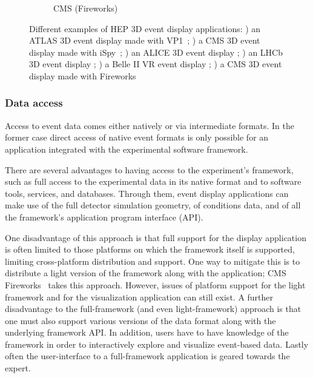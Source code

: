 \documentclass[12pt,a4paper]{article}
\begin{document}
\begin{figure}
\begin{subfigure}[b]{0.475\textwidth}
		\caption[CMS event display]%
		{{\small CMS (Fireworks)}}
		\label{fig:ed-cms-fireworks}
	\end{subfigure}
	\caption[Examples of HEP event displays]
	{\small Different examples of HEP 3D event display applications: ) an ATLAS 3D event display made with VP1~\cite{ATLASED072015,ATLASVP12010};
	) a CMS 3D event display made with iSpy~\cite{CMSED}; 
	) an ALICE 3D event display \cite{ALICEED};
	) an LHCb 3D event display \cite{LHCbED}; ) a Belle II VR event display \cite{BelleIIVRED}; 
	) a CMS 3D event display made with Fireworks~\cite{CMSFireworks}}
	\label{fig:screenshots}
\end{figure}



\hypertarget{data-access}{%
\subsubsection{Data access}\label{data-access}}

Access to event data comes either natively or via intermediate formats. In the former case direct access of native event formats
is only possible for an application integrated with the experimental software framework.

There are several advantages to having access to the experiment's framework, such as full access to the experimental
data in its native format and to software tools, services, and databases. Through them, event display applications can
make use of the full detector simulation geometry, of conditions data, and of all the framework's application program interface (API).

One disadvantage of this approach is that full support for the display application is often limited to those platforms
on which the framework itself is supported, limiting cross-platform distribution and support.
One way to mitigate this is to distribute a light version of the framework along with the application; CMS Fireworks~\cite{CMSFireworks}
takes this approach. However, issues of platform support for the light framework and for the visualization application can still exist.
A further disadvantage to the full-framework (and even light-framework) approach is that one must also support various versions of
the data format along with the underlying framework API. In addition, users have to have knowledge of the framework in order to interactively
explore and visualize event-based data. Lastly often the user-interface to a
full-framework application is geared towards the expert.
\end{document}
